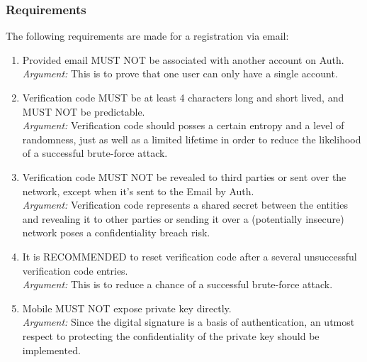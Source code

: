         \subsubsection{Requirements}
        The following requirements are made for a registration via email:
            \begin{enumerate}
                \item Provided email MUST NOT be associated with another account on Auth.\\
                \textit{Argument:} This is to prove that one user can only have a single account.

                \item Verification code MUST be at least 4 characters long and short lived, and MUST NOT be 
                      predictable.\\        
                \textit{Argument:} Verification code should posses a certain entropy and a level of randomness, 
                                   just as well as a limited lifetime in order to reduce the likelihood of a 
                                   successful brute-force attack.

                \item Verification code MUST NOT be revealed to third parties or sent over the network, except when
                    it's sent to the Email by Auth.\\        
                \textit{Argument:} Verification code represents a shared secret between the entities and revealing 
                                   it to other parties or sending it over a (potentially insecure) network poses 
                                   a confidentiality breach risk. 

                \item It is RECOMMENDED to reset verification code after a several unsuccessful verification 
                      code entries.\\        
                \textit{Argument:} This is to reduce a chance of a successful brute-force attack.

                \item Mobile MUST NOT expose private key directly.\\
                \textit{Argument:} Since the digital signature is a basis of authentication, an utmost respect to 
                                   protecting the confidentiality of the private key should be implemented.


\end{enumerate}
